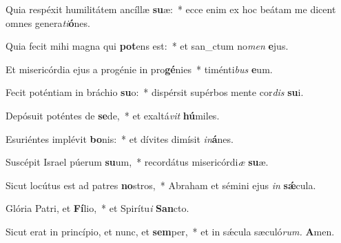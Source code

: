 \item Quia respéxit humilitátem ancíllæ \textbf{su}æ:~* ecce enim ex hoc beátam me dicent omnes genera\tinyhspace\textit{ti}\textbf{ó}nes.
\item Quia fecit mihi magna qui \textbf{pot}ens est:~* et san\_ctum no\textit{men} \textbf{e}jus.
\item Et misericórdia ejus a progénie in pro\textbf{gé}nies~* timénti\textit{bus} \textbf{e}um.
\item Fecit poténtiam in bráchio \textbf{su}o:~* dispérsit supérbos mente cor\textit{dis} \textbf{su}i.
\item Depósuit poténtes de \textbf{se}de,~* et exaltá\textit{vit} \textbf{hú}miles.
\item Esuriéntes implévit \textbf{bo}nis:~* et dívites dimísit \textit{in}\textbf{á}nes.
\item Suscépit Israel púerum \textbf{su}um,~* recordátus misericórdi\tinyhspace\textit{æ} \textbf{su}æ.
\item Sicut locútus est ad patres \textbf{no}stros,~* Abraham et sémini ejus \textit{in} \textbf{sǽ}cula.
\item Glória Patri, et \textbf{Fí}lio,~* et Spirítu\tinyhspace\textit{i} \textbf{San}cto.
\item Sicut erat in princípio, et nunc, et \textbf{sem}per,~* et in sǽcula sæculó\textit{rum.} \textbf{A}men.